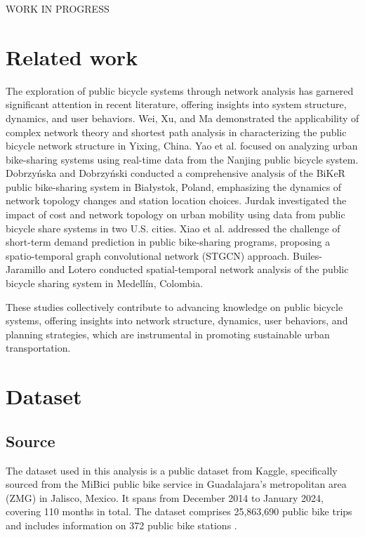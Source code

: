 \documentclass[conference]{IEEEtran}
\begin{document}

WORK IN PROGRESS

\section{Related work}

The exploration of public bicycle systems through network analysis has garnered significant attention in recent literature, offering insights into system structure, dynamics, and user behaviors. Wei, Xu, and Ma \cite{wei2019exploring} demonstrated the applicability of complex network theory and shortest path analysis in characterizing the public bicycle network structure in Yixing, China. Yao et al. \cite{yao2019analysis} focused on analyzing urban bike-sharing systems using real-time data from the Nanjing public bicycle system. Dobrzyńska and Dobrzyński \cite{dobrzynska2017structure} conducted a comprehensive analysis of the BiKeR public bike-sharing system in Białystok, Poland, emphasizing the dynamics of network topology changes and station location choices. Jurdak \cite{jurdak2013impact} investigated the impact of cost and network topology on urban mobility using data from public bicycle share systems in two U.S. cities. Xiao et al. \cite{xiao2021demand} addressed the challenge of short-term demand prediction in public bike-sharing programs, proposing a spatio-temporal graph convolutional network (STGCN) approach. Builes-Jaramillo and Lotero \cite{builes-jaramillo2022spatial} conducted spatial-temporal network analysis of the public bicycle sharing system in Medellín, Colombia. 

These studies collectively contribute to advancing knowledge on public bicycle systems, offering insights into network structure, dynamics, user behaviors, and planning strategies, which are instrumental in promoting sustainable urban transportation.

\section{Dataset}

\subsection{Source}
The dataset used in this analysis is a public dataset from Kaggle, specifically sourced from the MiBici public bike service in Guadalajara's metropolitan area (ZMG) in Jalisco, Mexico. It spans from December 2014 to January 2024, covering 110 months in total. The dataset comprises 25,863,690 public bike trips and includes information on 372 public bike stations \cite{quirarte2024mibici}.
\end{document}
